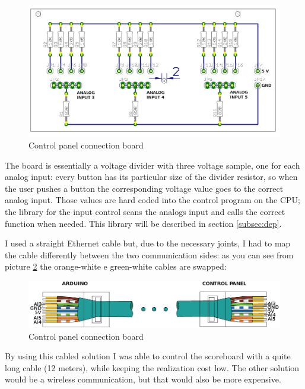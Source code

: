 \documentclass[11pt,english]{article}
\begin{document}
%
\begin{figure}[htb]
\centering\includegraphics[scale=0.25]{img/Panel-board}

\caption{Control panel connection board \label{fig:panel-board}}

\end{figure}

The board is essentially a voltage divider with three voltage sample, one for each analog input: every button 
has its particular size of the divider resistor, so when the user pushes a button the corresponding voltage 
value goes to the correct analog input. Those values are hard coded into the control program on the CPU; 
the library for the input control scans the analogs input and calls the correct function when needed. This
library will be described in section \ref{subsec:dep}.

I used a straight Ethernet cable but, due to the necessary joints, I had to map the cable differently between the 
two communication sides: as you can see from picture \ref{fig:panel-cable} the orange-white e green-white 
cables are swapped:

%
\begin{figure}[htb]
\centering\includegraphics[scale=0.40]{img/Panel-cable}

\caption{Control panel connection board \label{fig:panel-cable}}

\end{figure}

By using this cabled solution I was able to control the scoreboard with a quite long cable (12 meters), 
while keeping the realization cost low. The other solution would be a wireless communication, but that 
would also be more expensive.
\end{document}
